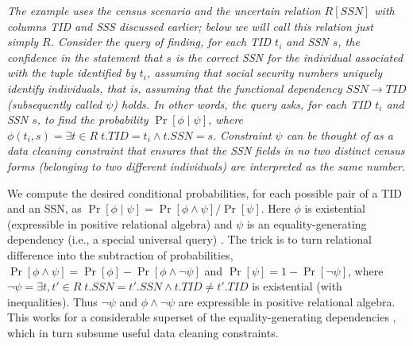 \begin{example}\em
\label{ex:trick}
%
The example uses the census scenario and the uncertain relation $R[SSN]$
with columns TID and SSS discussed earlier; below we will call this relation
just simply $R$.
Consider the query of finding, for each TID $t_i$ and SSN $s$, the confidence in the statement that $s$ is the correct SSN for the individual associated with the tuple identified by $t_i$, assuming
that social security numbers uniquely identify individuals, that is, assuming that the functional dependency
$SSN \rightarrow TID$ (subsequently called $\psi$) holds.
In other words, the query asks, for each TID $t_i$ and SSN $s$, to find the probability $\Pr[\phi \mid \psi]$, where
$
\phi(t_i,s) = \exists t \in R\; t.TID=t_i \land t.SSN=s.
$
%
Constraint $\psi$ can be thought of as a data cleaning constraint that ensures that the SSN fields in no two distinct census forms (belonging to two different individuals) are interpreted as the same number.

We compute the desired conditional probabilities, for each possible pair of a TID and an SSN, as
$
\Pr[\phi \mid \psi] = \Pr[\phi \land \psi] / \Pr[\psi].
$
Here $\phi$ is existential (expressible in positive relational algebra) and $\psi$ is an equality-generating dependency (i.e., a special universal query) \cite{AHV95}.
%
The trick is to turn relational difference into the subtraction of probabilities,
$\Pr[\phi \land \psi] = \Pr[\phi] - \Pr[\phi \land \neg \psi]$ and
$\Pr[\psi] = 1 - \Pr[\neg \psi]$, where
$
\neg \psi = \exists t,t' \in R \; t.SSN = t'.SSN \land t.TID \neq t'.TID
$
is existential (with inequalities). Thus $\neg \psi$ and $\phi \land \neg \psi$ are
expressible in positive relational algebra. This works for a considerable superset of the equality-generating dependencies \cite{Koch2008}, which in turn subsume useful data cleaning constraints.


\end{example}
